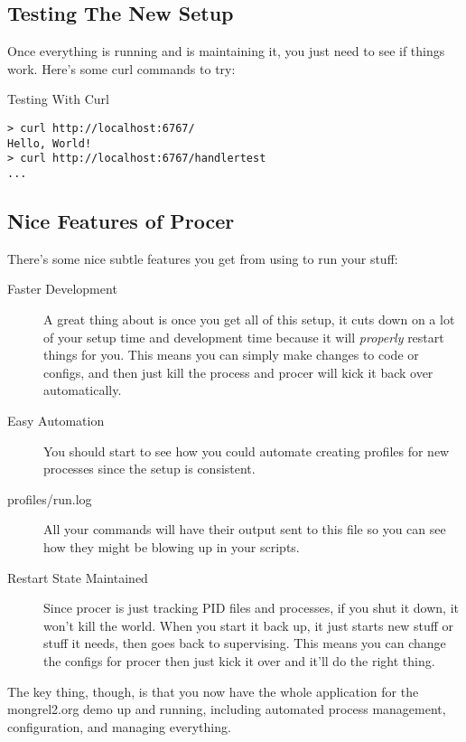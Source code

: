 \subsection{Testing The New Setup}

Once everything is running and  is maintaining it, you
just need to see if things work.  Here's some curl commands to try:

\begin{code}{Testing With Curl}
\begin{Verbatim}
> curl http://localhost:6767/
Hello, World!
> curl http://localhost:6767/handlertest
...
\end{Verbatim}
\end{code}


\subsection{Nice Features of Procer}

There's some nice subtle features you get from using 
to run your stuff:

\begin{description}
\item [Faster Development]  A great thing about  is once you get all of this setup,
    it cuts down on a lot of your setup time and development time because
    it will \emph{properly} restart things for you.  This means you can
    simply make changes to code or configs, and then just kill the process and
    procer will kick it back over automatically.
\item [Easy Automation]  You should start to see how you could automate creating
    profiles for new processes since the setup is consistent.
\item [profiles/run.log]  All your commands will have their output sent to
    this file so you can see how they might be blowing up in your scripts.
\item [Restart State Maintained]  Since procer is just tracking PID files and
    processes, if you shut it down, it won't kill the world.  When you start
    it back up, it just starts new stuff or stuff it needs, then goes back to
    supervising.  This means you can change the configs for procer then just
    kick it over and it'll do the right thing.
\end{description}

The key thing, though, is that you now have the whole application for
the mongrel2.org demo up and running, including automated process management,
configuration, and managing everything.

